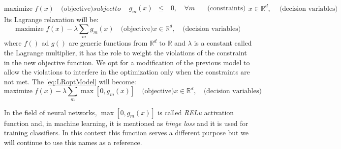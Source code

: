 \begin{subequations}\label{eq:optModel}
	
	\begin{equation}
	\mbox{maximize } {f(x)} \quad \mbox{(objective)}
	\end{equation}
	subject to    
	\begin{alignat}{3}
	&g_m(x) &\le \ & 0 , \ & \forall m \quad & \mbox{(constraints)}
	\end{alignat}
	\begin{equation*}
	x \in \mathbb{R}^d, \ \quad \mbox{(decision variables)}
	\end{equation*}
	
\end{subequations}
Its Lagrange relaxation will be:
\begin{subequations}\label{eq:LRoptModel}
	
	\begin{equation}
	\mbox{maximize } {f(x)-\lambda\sum_m g_m(x)} \quad \mbox{(objective)}
	\end{equation}
	
	\begin{equation*}
	x \in \mathbb{R}^d, \quad \mbox{(decision variables)}
	\end{equation*}
\end{subequations}
where $f()$ ad $g()$ are generic functions from $\mathbb{R}^d$ to $\mathbb{R}$ and $\lambda$ is a constant called the Lagrange multiplier, it has the role to weight the violations of the constraint in the new objective function.
We opt for a modification of the previous model to allow the violations to interfere in the optimization only when the constraints are not met. The \eqref{eq:LRoptModel} will become:
\begin{subequations}\label{eq:LRoptModelmax0}
	\begin{equation}
	\mbox{maximize } {f(x)-\lambda\sum_m \max{[0,g_m(x)]}} \quad \mbox{(objective)}
	\end{equation}
	
	\begin{equation*}
	x \in \mathbb{R}^d, \quad \mbox{(decision variables)}
	\end{equation*}
\end{subequations}

In the field of neural networks, $\max{[0,g_m(x)]}$ is called \emph{RELu} activation function and, in machine learning, it is mentioned as \emph{hinge loss} and it is used for training classifiers. In this context this function serves a different purpose but we will continue to use this names as a reference.

